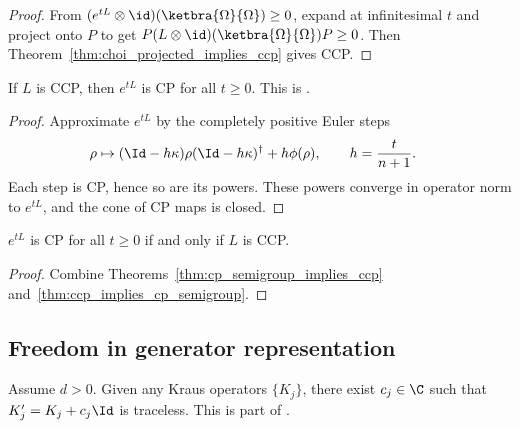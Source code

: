 \begin{proof}
    \leanok
    From $(e^{tL}\otimes\id)(\ketbra{\Omega}{\Omega}) \ge 0$,
    expand at infinitesimal $t$ and project onto $P$ to get
    $P(L\otimes\id)(\ketbra{\Omega}{\Omega})P \ge 0$.
    Then Theorem~\ref{thm:choi_projected_implies_ccp} gives CCP.
\end{proof}

\begin{theorem}
    \label{thm:ccp_implies_cp_semigroup}
    \leanok
    If $L$ is CCP, then $e^{tL}$ is CP for all $t \ge 0$.
    This is \cite[Proposition~7.3]{Wolf2012Quantum}.
\end{theorem}

\begin{proof}
    \leanok
    Approximate $e^{tL}$ by the completely positive Euler steps
    \begin{align}
        \rho
        &\mapsto (\Id-h\kappa)\rho(\Id-h\kappa)^\dagger+h\phi(\rho),
        \qquad h=\frac{t}{n+1}.
        \notag
    \end{align}
    Each step is CP, hence so are its powers. These powers converge in operator
    norm to $e^{tL}$, and the cone of CP maps is closed.
\end{proof}

\begin{theorem}
    \label{thm:cp_semigroup_iff_ccp}
    \leanok
    $e^{tL}$ is CP for all $t \ge 0$ if and only if $L$ is CCP.
\end{theorem}

\begin{proof}
    \leanok
    Combine Theorems~\ref{thm:cp_semigroup_implies_ccp}
    and~\ref{thm:ccp_implies_cp_semigroup}.
\end{proof}

\subsection{Freedom in generator representation}

\begin{theorem}
    \label{thm:exists_traceless_kraus_shift}
    \leanok
    Assume $d > 0$. Given any Kraus operators $\{K_j\}$, there exist
    $c_j \in \C$ such that $K_j' = K_j+c_j\Id$ is traceless.
    This is part of \cite[Proposition~7.4]{Wolf2012Quantum}.
\end{theorem}

